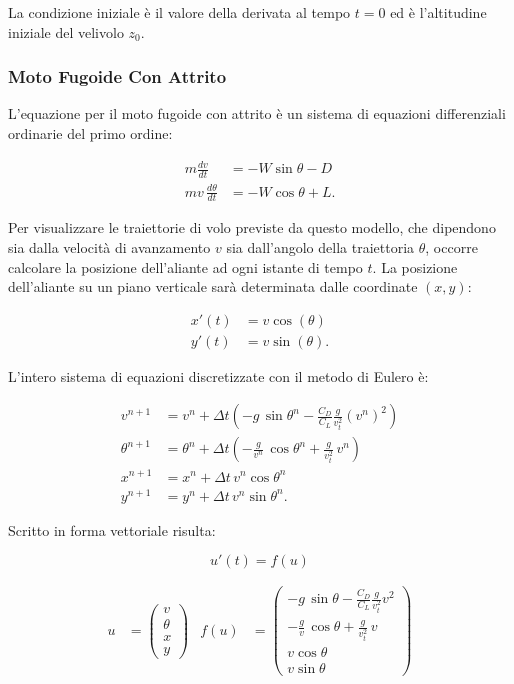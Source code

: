 \noindent 
La condizione iniziale è il valore della derivata al tempo $t=0$ ed è l'altitudine iniziale del velivolo $z_0$.

\subsubsection*{Moto Fugoide Con Attrito}
L’equazione per il moto fugoide con attrito è un sistema di equazioni differenziali ordinarie del primo ordine: 

\begin{align}
m \frac{dv}{dt} & = - W \sin\theta - D \\
m v \, \frac{d\theta}{dt} & = - W \cos\theta + L.
\end{align}

\noindent
Per visualizzare le traiettorie di volo previste da questo modello, che dipendono sia dalla velocità di avanzamento $v$ sia dall’angolo della traiettoria $\theta$, occorre calcolare la posizione dell'aliante ad ogni istante di tempo $t$. La posizione dell’aliante su un piano verticale sarà determinata dalle coordinate $(x,y)$: 

\begin{align}
x'(t) & = v \cos(\theta) \\
y'(t) & = v \sin(\theta).
\end{align}

\noindent
L’intero sistema di equazioni discretizzate con il metodo di Eulero è:

\begin{align}
v^{n+1} & = v^n + \Delta t \left(- g\, \sin\theta^n - \frac{C_D}{C_L} \frac{g}{v_t^2} (v^n)^2 \right) \\
\theta^{n+1} & = \theta^n + \Delta t \left(- \frac{g}{v^n}\,\cos\theta^n + \frac{g}{v_t^2}\, v^n \right) \\
x^{n+1} & = x^n + \Delta t \, v^n \cos\theta^n \\
y^{n+1} & = y^n + \Delta t \, v^n \sin\theta^n.
\end{align}

\noindent
Scritto in forma vettoriale risulta: 

$$u'(t) = f(u)$$

\begin{align}
u & = \begin{pmatrix} v \\ \theta \\ x \\ y \end{pmatrix} & f(u) & = \begin{pmatrix} - g\, \sin\theta - \frac{C_D}{C_L} \frac{g}{v_t^2} v^2 \\ - \frac{g}{v}\,\cos\theta + \frac{g}{v_t^2}\, v \\ v\cos\theta \\ v\sin\theta \end{pmatrix}
\end{align}

